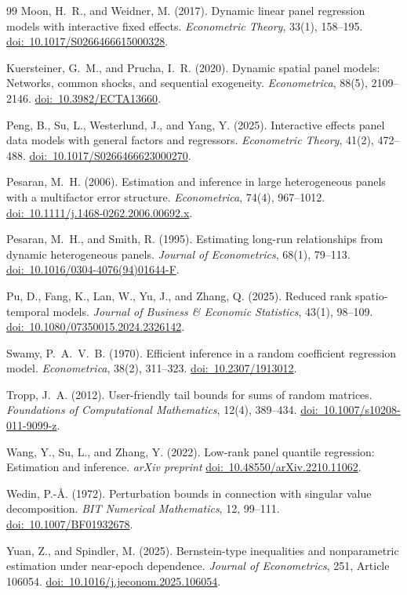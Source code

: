 \documentclass[11pt]{article}
\numberwithin{equation}{section}
\theoremstyle{remark}
\newcommand{\doilink}[1]{\href{https://doi.org/#1}{doi:\ #1}}
\begin{document}
\begin{singlespace}
\begin{thebibliography}{99}
Moon, H.~R., and Weidner, M. (2017).
Dynamic linear panel regression models with interactive fixed effects.
\emph{Econometric Theory}, 33(1), 158--195.
\doilink{10.1017/S0266466615000328}.

Kuersteiner, G.~M., and Prucha, I.~R. (2020).
Dynamic spatial panel models: Networks, common shocks, and sequential exogeneity.
\emph{Econometrica}, 88(5), 2109--2146.
\doilink{10.3982/ECTA13660}.

Peng, B., Su, L., Westerlund, J., and Yang, Y. (2025).
Interactive effects panel data models with general factors and regressors.
\emph{Econometric Theory}, 41(2), 472--488.
\doilink{10.1017/S0266466623000270}.

Pesaran, M.~H. (2006).
Estimation and inference in large heterogeneous panels with a multifactor error structure.
\emph{Econometrica}, 74(4), 967--1012.
\doilink{10.1111/j.1468-0262.2006.00692.x}.

Pesaran, M.~H., and Smith, R. (1995).
Estimating long-run relationships from dynamic heterogeneous panels.
\emph{Journal of Econometrics}, 68(1), 79--113.
\doilink{10.1016/0304-4076(94)01644-F}.

Pu, D., Fang, K., Lan, W., Yu, J., and Zhang, Q. (2025).
Reduced rank spatio-temporal models.
\emph{Journal of Business \& Economic Statistics}, 43(1), 98--109.
\doilink{10.1080/07350015.2024.2326142}.

Swamy, P.~A.~V.~B. (1970).
Efficient inference in a random coefficient regression model.
\emph{Econometrica}, 38(2), 311--323.
\doilink{10.2307/1913012}.

Tropp, J.~A. (2012).
User-friendly tail bounds for sums of random matrices.
\emph{Foundations of Computational Mathematics}, 12(4), 389--434.
\doilink{10.1007/s10208-011-9099-z}.

Wang, Y., Su, L., and Zhang, Y. (2022).
Low-rank panel quantile regression: Estimation and inference.
\emph{arXiv preprint} \doilink{10.48550/arXiv.2210.11062}.

Wedin, P.-\AA. (1972).
Perturbation bounds in connection with singular value decomposition.
\emph{BIT Numerical Mathematics}, 12, 99--111.
\doilink{10.1007/BF01932678}.

Yuan, Z., and Spindler, M. (2025).
Bernstein-type inequalities and nonparametric estimation under near-epoch dependence.
\emph{Journal of Econometrics}, 251, Article 106054.
\doilink{10.1016/j.jeconom.2025.106054}.

\end{thebibliography}
\end{singlespace}
\end{document}
